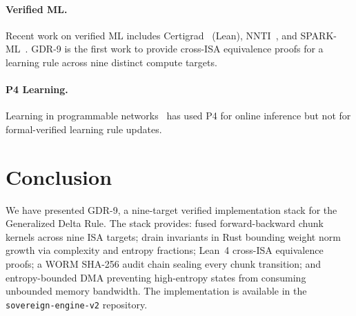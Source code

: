 \documentclass[10pt,conference]{IEEEtran}
\begin{document}
\paragraph{Verified ML.}
Recent work on verified ML includes Certigrad~\cite{lee2018certigrad} (Lean),
NNTI~\cite{seshia2020nnti}, and SPARK-ML~\cite{amato2018spark}.
GDR-9 is the first work to provide cross-ISA equivalence proofs for a learning
rule across nine distinct compute targets.

\paragraph{P4 Learning.}
Learning in programmable networks~\cite{swamy2022taurus} has used P4 for
online inference but not for formal-verified learning rule updates.


\section{Conclusion}

We have presented GDR-9, a nine-target verified implementation stack for the
Generalized Delta Rule. The stack provides: fused forward-backward chunk
kernels across nine ISA targets; drain invariants in Rust bounding weight norm
growth via complexity and entropy fractions; Lean~4 cross-ISA equivalence
proofs; a WORM SHA-256 audit chain sealing every chunk transition; and
entropy-bounded DMA preventing high-entropy states from consuming unbounded
memory bandwidth. The implementation is available in the \texttt{sovereign-engine-v2}
repository.
\end{document}
